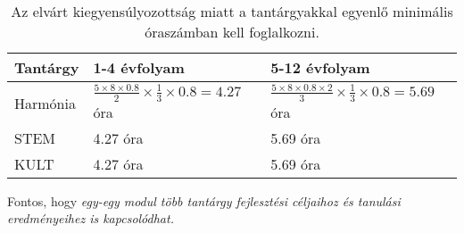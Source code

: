 \begin{table}

  \begin{tabular}{ l|l|l }

    \textbf{Tantárgy} & \textbf{1-4 évfolyam}                               & \textbf{5-12 évfolyam}
    \\ \hline
    Harmónia          & $\frac{5 \times 8 \times 0.8}{2} \times \frac{1}{3}
      \times 0.8 =
    4.27$ óra         &
    $\frac{5 \times 8 \times 0.8 \times 2}{3} \times \frac{1}{3} \times 0.8 =
      5.69$
    óra
    \\ \hline
    STEM              & 4.27 óra
                      & 5.69 óra                                                                     \\
    \hline
    KULT              & 4.27 óra
                      & 5.69 óra                                                                     \\
    \hline

  \end{tabular}
  \caption{Az elvárt kiegyensúlyozottság miatt a tantárgyakkal egyenlő
    minimális óraszámban kell foglalkozni.}
  \label{tbl:oraszamok}
\end{table}

Fontos, hogy \emph{egy-egy modul több tantárgy fejlesztési céljaihoz és
  tanulási eredményeihez is kapcsolódhat.}